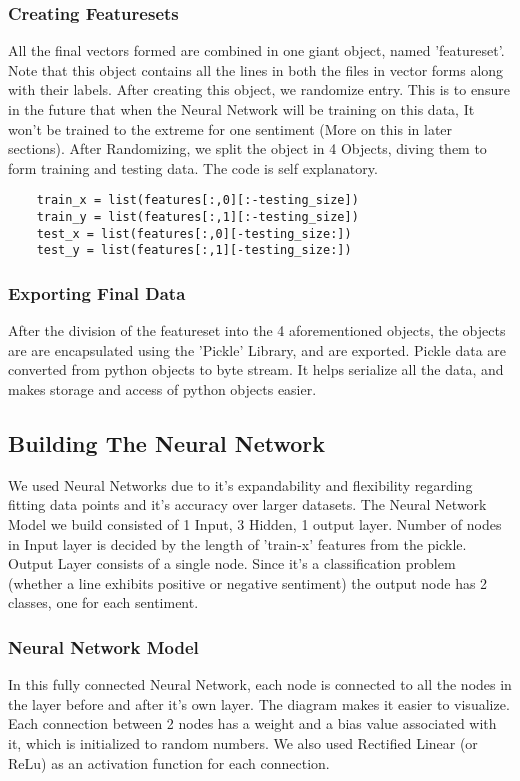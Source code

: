 \subsubsection{Creating Featuresets}
All the final vectors formed are combined in one giant object, named 'featureset'. Note that this object contains all the lines in both the files in vector forms along with their labels.
After creating this object, we randomize entry. This is to ensure in the future that when the Neural Network will be training on this data, It won't be trained to the extreme for one sentiment (More on this in later sections).
After Randomizing, we split the object in 4 Objects, diving them to form training and testing data. The code is self explanatory.

\begin{verbatim}
    train_x = list(features[:,0][:-testing_size])
    train_y = list(features[:,1][:-testing_size])
    test_x = list(features[:,0][-testing_size:])
    test_y = list(features[:,1][-testing_size:])
\end{verbatim}

\subsubsection{Exporting Final Data}
After the division of the featureset into the 4 aforementioned objects, the objects are are encapsulated using the 'Pickle' Library, and are exported. Pickle data are converted from python objects to byte stream. It helps serialize all the data, and makes storage and access of python objects easier.

\subsection{Building The Neural Network}
We used Neural Networks due to it's expandability and flexibility regarding fitting data points and it's accuracy over larger datasets. The Neural Network Model we build consisted of 1 Input, 3 Hidden, 1 output layer. Number of nodes in Input layer is decided by the length of 'train-x' features from the pickle. Output Layer consists of a single node. Since it's a classification problem (whether a line exhibits positive or negative sentiment) the output node has 2 classes, one for each sentiment.

\subsubsection{Neural Network Model}
In this fully connected Neural Network, each node is connected to all the nodes in the layer before and after it's own layer. The diagram makes it easier to visualize. Each connection between 2 nodes has a weight and a bias value associated with it, which is initialized to random numbers. We also used Rectified Linear (or ReLu) as an activation function for each connection. 

